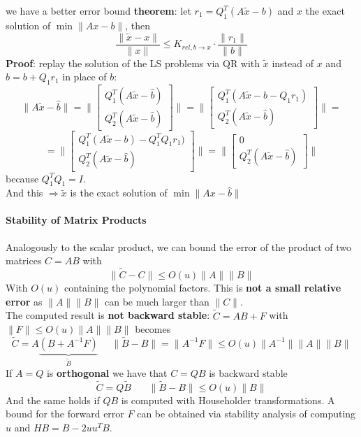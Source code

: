 \documentclass[10pt]{report}
\begin{document}
we have a better error bound \textbf{theorem}: let $r_1 = Q_1^T(A\tilde{x}-b)$ and $x$ the exact solution of $\min\|Ax-b\|$, then $$\frac{\|\tilde{x}-x\|}{\|x\|}\leq K_{rel, b\rightarrow x}\cdot\frac{\|r_1\|}{\|b\|}$$
\textbf{Proof}: replay the solution of the LS problems via QR with $\tilde{x}$ instead of $x$ and $\hat{b}=b+Q_1r_1$ in place of $b$: $$\|A\tilde{x}-\hat{b}\| = \|\left[\begin{array}{c}
Q_1^T(A\tilde{x}-\hat{b})\\Q_2^T(A\tilde{x}-\hat{b})
\end{array}\right]\|=\|\left[\begin{array}{c}
Q_1^T(A\tilde{x}-b-Q_1r_1)\\
Q_2^T(A\tilde{x}-\hat{b})
\end{array}\right]\|=$$
$$=\|\left[\begin{array}{c}
Q_1^T(A\tilde{x}-b)-Q_1^TQ_1r_1)\\
Q_2^T(A\tilde{x}-\hat{b})
\end{array}\right]\|=\|\left[\begin{array}{c}
0\\
Q_2^T(A\tilde{x}-\hat{b})
\end{array}\right]\|$$
because $Q_1^TQ_1=I$.\\
And this $\Rightarrow\tilde{x}$ is the exact solution of $\min\|Ax-\hat{b}\|$
\paragraph{Stability of Matrix Products} Analogously to the scalar product, we can bound the error of the product of two matrices $C = AB$ with $$\|\tilde{C}-C\|\leq O(u)\|A\|\|B\|$$
With $O(u)$ containing the polynomial factors. This is \textbf{not a small relative error} as $\|A\|\|B\|$ can be much larger than $\|C\|$.\\
The computed result is \textbf{not backward stable}: $\tilde{C} = AB + F$ with $\|F\|\leq O(u)\|A\|\|B\|$ becomes
$$\tilde{C} = A\underset{\tilde{B}}{\underbrace{(B+A^{-1}F)}}\:\:\:\:\:\:\|\tilde{B}-B\| = \|A^{-1}F\| \leq O(u)\|A^{-1}\|\|A\|\|B\|$$
If $A = Q$ is \textbf{orthogonal} we have that $C = QB$ is backward stable
$$\tilde{C} = Q\tilde{B}\:\:\:\:\:\:\:\:\|\tilde{B}-B\|\leq O(u)\|B\|$$
And the same holds if $QB$ is computed with Householder transformations. A bound for the forward error $F$ can be obtained via stability analysis of computing $u$ and $HB = B - 2uu^TB$.
\end{document}
